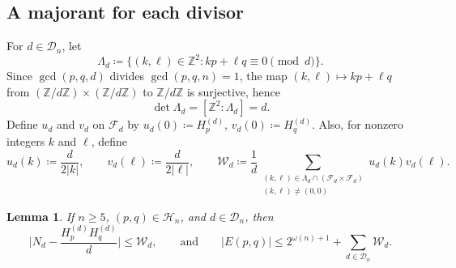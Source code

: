 \documentclass[12pt]{amsart}
\newtheorem{lemma}[theorem]{Lemma}
\theoremstyle{definition}
\newcommand{\Z}{\mathbb{Z}}
\begin{document}
\subsection{A majorant for each divisor}

For $d\in\mathcal{D}_n$, let
\begin{equation}
\label{eqn:Lambda_d_def}
\Lambda_d\coloneq \{(k,\ell)\in\Z^2\colon kp+\ell q\equiv0\pmod d\}.
\end{equation}
Since $\gcd(p,q,d)$ divides $\gcd(p,q,n)=1$, the map $(k,\ell)\mapsto kp+\ell q$ from
$(\Z/d\Z)\times(\Z/d\Z)$ to $\Z/d\Z$ is surjective, hence
\begin{equation}
\label{eqn:detLambda}
\det\Lambda_d=[\Z^2:\Lambda_d]=d.
\end{equation}
Define $u_d$ and $v_d$ on $\mathcal{F}_d$ by $u_d(0)\coloneq H_p^{(d)}$, $v_d(0)\coloneq H_q^{(d)}$.  Also, for nonzero integers $k$ and $\ell$, define
\[
u_d(k)\coloneq \frac{d}{2|k|},\qquad v_d(\ell)\coloneq \frac{d}{2|\ell|},\qquad  \mathcal{W}_d\coloneq \frac1d\sum_{\substack{(k,\ell)\in\Lambda_d\cap(\mathcal{F}_d\times \mathcal{F}_d)\\ (k,\ell)\ne(0,0)}}u_d(k) v_d(\ell).
\]

\begin{lemma}
\label{lem:majd}
If $n\ge5$, $(p,q)\in\mathcal{H}_n$, and $d\in\mathcal{D}_n$, then
\[
\Big|N_d-\frac{H^{(d)}_pH^{(d)}_q}{d}\Big|\le\mathcal{W}_d, \qquad\text{and}\qquad |E(p,q)|\le 2^{\omega(n)+1}+\sum_{d\in\mathcal{D}_n}\mathcal{W}_d.
\]
\end{lemma}
\end{document}
